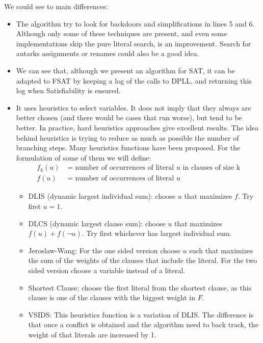 We could see to main differences:
\begin{itemize}
\item The algorithm try to look for backdoors and simplifications in lines 5 and 6. Although only some of these techniques are present, and even some implementations skip the pure  literal search, is an improvement. Search for autarks assignments or renames could also be a good idea.

\item We can see that, although we present an algorithm for SAT, it can be adapted to FSAT by keeping a log of the calls to DPLL, and returning this log when Satisfiability is ensured.
  
\item It uses heuristics to select variables. It does not imply that they always are better chosen  (and there would be cases that run worse), but tend to be better. In practice, hard heuristics approaches give excellent results\cite{sinz2009problem}. The idea behind heuristics is trying to reduce as much as possible the number of branching steps. Many heuristics functions have been proposed. For the formulation of some of them we will define:
  \begin{equation}
    \begin{split}
      f_k(u) & = \text{number of occurrences of literal } u \text{ in clauses of size k}\\
      f(u) & = \text{number of occurrences of literal } u
\end{split}
\end{equation}
  
  \begin{itemize}
  \item DLIS (dynamic largest individual sum): choose $u$ that maximizes $f$. Try first $u=1$.
  \item DLCS (dynamic largest clause sum):  choose $u$ that maximizes $f(u)+f(\neg u)$. Try first whichever has largest individual sum.
  \item Jeroslaw-Wang: For the one sided version choose $u$ such that maximizes the sum of the weights of the clauses that include the literal. For the two sided version choose a variable instead of a literal.
  \item Shortest Clause: choose the first literal from the shortest clause, as this clause is one of the clauses with the biggest weight in $F$.
  \item VSIDS: This heuristics function is a variation of DLIS. The difference is that once a conflict is obtained and the algorithm need to back track, the weight of that literals are increased by 1.
  \end{itemize}
\end{itemize}

